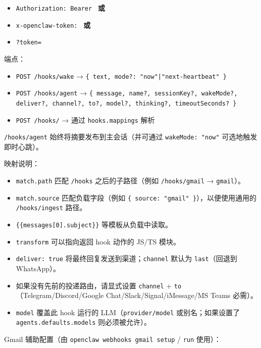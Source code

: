 \begin{itemize}
  \item \texttt{Authorization: Bearer } \textbf{或}
  \item \texttt{x-openclaw-token: } \textbf{或}
  \item \texttt{?token=}
\end{itemize}


端点：

\begin{itemize}
  \item \texttt{POST /hooks/wake} → \texttt{\{ text, mode?: "now"|"next-heartbeat" \}}
  \item \texttt{POST /hooks/agent} → \texttt{\{ message, name?, sessionKey?, wakeMode?, deliver?, channel?, to?, model?, thinking?, timeoutSeconds? \}}
  \item \texttt{POST /hooks/} → 通过 \texttt{hooks.mappings} 解析
\end{itemize}


\texttt{/hooks/agent} 始终将摘要发布到主会话（并可通过 \texttt{wakeMode: "now"} 可选地触发即时心跳）。

映射说明：

\begin{itemize}
  \item \texttt{match.path} 匹配 \texttt{/hooks} 之后的子路径（例如 \texttt{/hooks/gmail} → \texttt{gmail}）。
  \item \texttt{match.source} 匹配负载字段（例如 \texttt{\{ source: "gmail" \}}），以便使用通用的 \texttt{/hooks/ingest} 路径。
  \item \texttt{\{\{messages[0].subject\}\}} 等模板从负载中读取。
  \item \texttt{transform} 可以指向返回 hook 动作的 JS/TS 模块。
  \item \texttt{deliver: true} 将最终回复发送到渠道；\texttt{channel} 默认为 \texttt{last}（回退到 WhatsApp）。
  \item 如果没有先前的投递路由，请显式设置 \texttt{channel} + \texttt{to}（Telegram/Discord/Google Chat/Slack/Signal/iMessage/MS Teams 必需）。
  \item \texttt{model} 覆盖此 hook 运行的 LLM（\texttt{provider/model} 或别名；如果设置了 \texttt{agents.defaults.models} 则必须被允许）。
\end{itemize}


Gmail 辅助配置（由 \texttt{openclaw webhooks gmail setup} / \texttt{run} 使用）：

